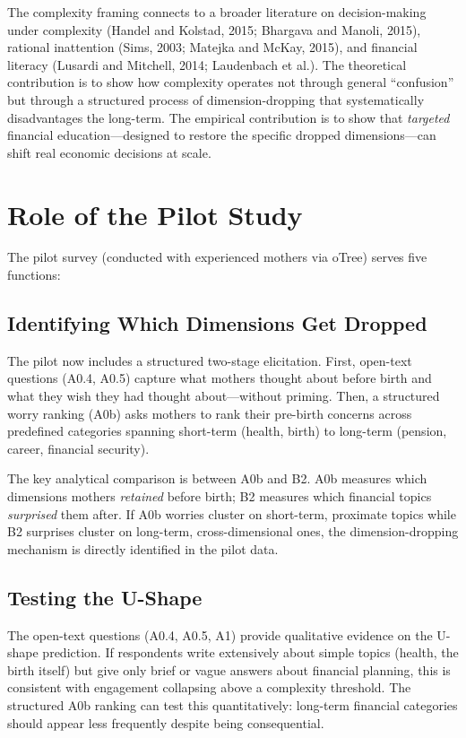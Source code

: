 \documentclass[12pt,a4paper]{article}
\begin{document}
\noindent The complexity framing connects to a broader literature on decision-making under complexity (Handel and Kolstad, 2015; Bhargava and Manoli, 2015), rational inattention (Sims, 2003; Matejka and McKay, 2015), and financial literacy (Lusardi and Mitchell, 2014; Laudenbach et al.). The theoretical contribution is to show how complexity operates not through general ``confusion'' but through a structured process of dimension-dropping that systematically disadvantages the long-term. The empirical contribution is to show that \emph{targeted} financial education---designed to restore the specific dropped dimensions---can shift real economic decisions at scale.

\section{Role of the Pilot Study}

The pilot survey (conducted with experienced mothers via oTree) serves five functions:

\subsection{Identifying Which Dimensions Get Dropped}

The pilot now includes a structured two-stage elicitation. First, open-text questions (A0.4, A0.5) capture what mothers thought about before birth and what they wish they had thought about---without priming. Then, a structured worry ranking (A0b) asks mothers to rank their pre-birth concerns across predefined categories spanning short-term (health, birth) to long-term (pension, career, financial security).

The key analytical comparison is between A0b and B2. A0b measures which dimensions mothers \emph{retained} before birth; B2 measures which financial topics \emph{surprised} them after. If A0b worries cluster on short-term, proximate topics while B2 surprises cluster on long-term, cross-dimensional ones, the dimension-dropping mechanism is directly identified in the pilot data.

\subsection{Testing the U-Shape}

The open-text questions (A0.4, A0.5, A1) provide qualitative evidence on the U-shape prediction. If respondents write extensively about simple topics (health, the birth itself) but give only brief or vague answers about financial planning, this is consistent with engagement collapsing above a complexity threshold. The structured A0b ranking can test this quantitatively: long-term financial categories should appear less frequently despite being consequential.
\end{document}
